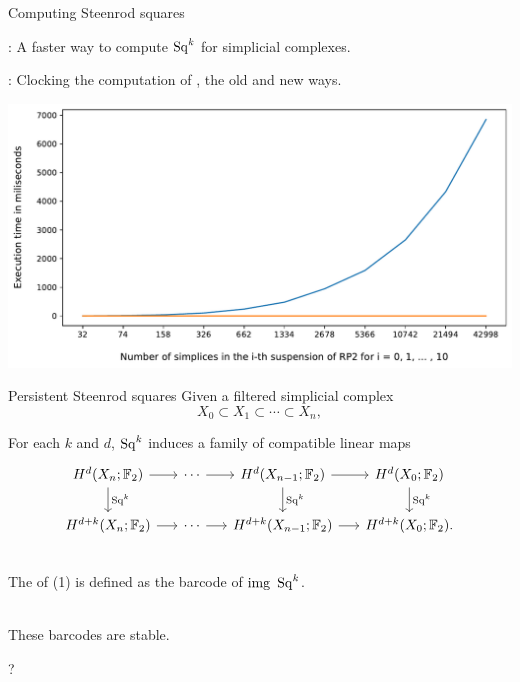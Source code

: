 \begin{frame}{Computing Steenrod squares}
	\pause

	: A faster way to compute $\operatorname{Sq}^k$ for simplicial complexes.

	\pause\medskip
	: Clocking the computation of , the old and new ways.
	\vspace*{10pt}

	\includegraphics[width=\textwidth]{aux/comp_sus_rp2.pdf}
\end{frame}

\begin{frame}[fragile]{Persistent Steenrod squares}
	\pause
	Given a filtered simplicial complex
	\begin{equation}\label{eq:filtration}
		X_0 \subset X_1 \subset \cdots \subset X_n,
	\end{equation}

	\pause\smallskip
	For each $k$ and $d$, $\operatorname{Sq}^k$ induces a family of compatible linear maps
	\[
	\begin{tikzcd}[column sep = 15]
		H^d(X_n; \Ftwo) \arrow[d, "\Sq^k"] \arrow[r] & \cdots \arrow[r] & H^d(X_{n-1}; \Ftwo) \arrow[d, "\Sq^k"] \arrow[r] & H^d(X_0; \Ftwo) \arrow[d, "\Sq^k"]  \\
		H^{d+k}(X_n; \Ftwo) \arrow[r] & \cdots \arrow[r] & H^{d+k}(X_{n-1}; \Ftwo) \arrow[r] & H^{d+k}(X_0; \Ftwo).
	\end{tikzcd}
	\]

	\pause
	 \\
	The  of (1) is defined as the barcode of $\mathrm{img}\ \operatorname{Sq}^k$.

	\pause\bigskip
	 \\
	These barcodes are stable.

	\pause\bigskip
	?
\end{frame}

